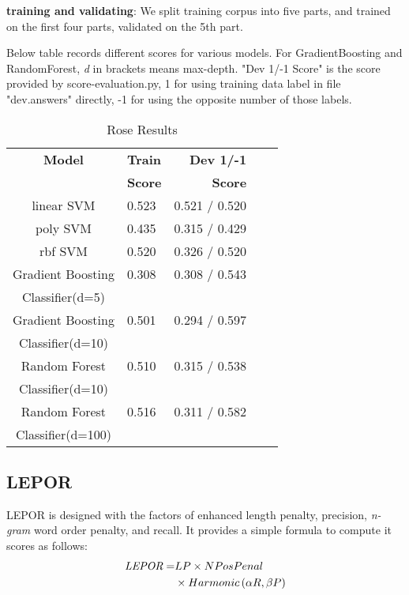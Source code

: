 \documentclass[11pt]{article}
\begin{document}
{\bf training and validating}: We split training corpus into five parts, and trained on the first four parts, validated on the 5th part.

Below table records different scores for various models. For GradientBoosting and RandomForest, \emph{d} in brackets means max-depth. "Dev 1/-1 Score" is the score provided by score-evaluation.py, 1 for using training data label in file "dev.answers" directly, -1 for using the opposite number of those labels.

\begin{table}[h]
\begin{center}
\begin{tabular}{|c|l|r|cr|}
\hline
{\bf Model}          & {\bf Train} & {\bf Dev 1/-1} \\ %
                     & {\bf Score} & {\bf Score} \\ %
\hline
linear SVM           & 0.523 & 0.521 / 0.520 \\
poly SVM             & 0.435 & 0.315 / 0.429 \\
rbf SVM              & 0.520 & 0.326 / 0.520 \\
Gradient Boosting    & 0.308 & 0.308 / 0.543 \\
Classifier(d=5)      &       &               \\
Gradient Boosting    & 0.501 & 0.294 / 0.597 \\
Classifier(d=10)     &       &               \\
Random Forest        & 0.510 & 0.315 / 0.538 \\
Classifier(d=10)     &       &               \\
Random Forest        & 0.516 & 0.311 / 0.582 \\
Classifier(d=100)    &       &               \\
\hline
\end{tabular}
\end{center}
\caption{\label{tab:rose} Rose Results}
\end{table}

\subsection{LEPOR}
LEPOR \cite{StatMT:12} is designed with the factors of enhanced length penalty, precision, \emph{n-gram} word order penalty, and recall. It provides a simple formula to compute it scores as follows:
\begin{equation}
\begin{aligned}
\emph{LEPOR} =& LP \times NPosPenal \\& \times Harmonic\left ( \alpha R, \beta P \right )
\end{aligned}
\end{equation}
\end{document}
